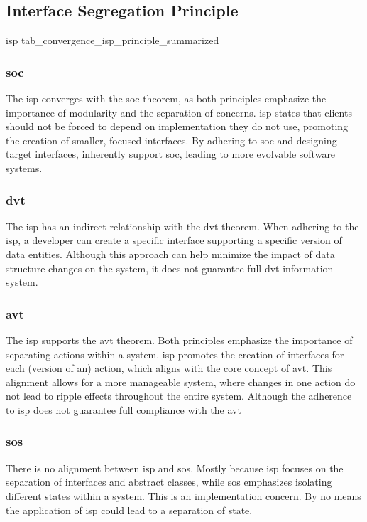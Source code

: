 \subsection{Interface Segregation Principle}

\compareTable
{\acrlong*{isp}}
{tab_convergence_isp_principle_summarized}
{\addEvalRow{\fullAlignment & \partialAlignment & \partialAlignment & \noAlignment}}

\subsubsection{\acrlong*{soc}}
The \gls{isp} converges with the \gls{soc} theorem, as both principles emphasize the
importance of modularity and the separation of concerns. \gls{isp} states that clients
should not be forced to depend on implementation they do not use, promoting the creation
of smaller, focused interfaces. By adhering to \gls{soc} and designing target interfaces,
inherently support \gls{soc}, leading to more evolvable software systems.

\subsubsection{\acrlong*{dvt}} The \gls{isp} has an indirect relationship with the
\gls{dvt} theorem. When adhering to the \gls{isp}, a developer can create a specific
interface supporting a specific version of data entities. Although this approach can help
minimize the impact of data structure changes on the system, it does not guarantee full
\gls{dvt} information system.

\subsubsection{\acrlong*{avt}} The \gls{isp} supports the \gls{avt} theorem. Both
principles emphasize the importance of separating actions within a system. \gls{isp}
promotes the creation of interfaces for each (version of an) action, which aligns with the
core concept of \gls{avt}. This alignment allows for a more manageable system, where
changes in one action do not lead to ripple effects throughout the entire system. Although
the adherence to \gls{isp} does not guarantee full compliance with the \gls{avt}

\subsubsection{\acrlong*{sos}} There is no alignment between \gls{isp} and \gls{sos}.
Mostly because \gls{isp} focuses on the separation of interfaces and abstract classes,
while \gls{sos} emphasizes isolating different states within a system. This is an
implementation concern. By no means the application of \gls{isp} could lead to a
separation of state.
